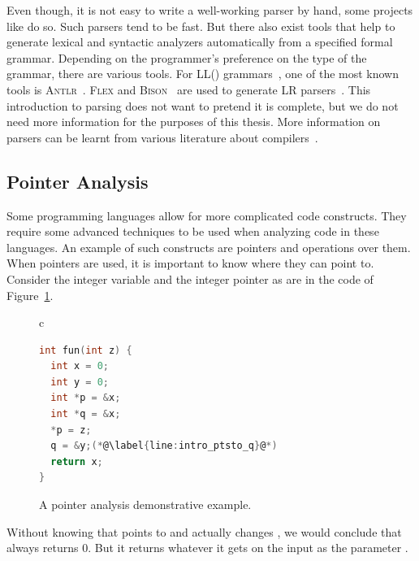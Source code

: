 Even though, it is not easy to write a well-working parser by hand, some
projects like \gcc do so. Such parsers tend to be fast. But there also
exist tools that help to generate lexical and syntactic analyzers
automatically from a specified formal grammar.  Depending on the programmer's
preference on the type of the grammar, there are various tools. For
LL(\textasteriskcentered) grammars~\cite[Chapter 4.4]{dragon}, one of the most
known tools is \textsc{Antlr}~\cite{antlr4}.  \textsc{Flex} and
\textsc{Bison}~\cite{flex_bison} are used to generate LR parsers~\cite[Chapter
4.5]{dragon}. This introduction to parsing does not want to pretend it is
complete, but we do not need more information for the purposes of this thesis.
More information on parsers can be learnt from various literature about
compilers~\cite{dragon, muchnick}.

\subsection{Pointer Analysis}\label{sec:pointer_analysis}
Some programming languages allow for more complicated code constructs. They
require some advanced techniques to be used when analyzing code in these
languages. An example of such constructs are pointers and operations over
them. When pointers are used, it is important to know where they can point to.
Consider the integer variable  and the integer pointer  as are
in the code of Figure~\ref{fig:lst_ptsto}.
\begin{figure}[htb]
  \begin{center}
  \begin{tabular}{c}
  \begin{lstlisting}[language=C]
int fun(int z) {
  int x = 0;
  int y = 0;
  int *p = &x;
  int *q = &x;
  *p = z;
  q = &y;(*@\label{line:intro_ptsto_q}@*)
  return x;
}
  \end{lstlisting}
  \end{tabular}
  \end{center}
  \caption{A pointer analysis demonstrative example.}
  \label{fig:lst_ptsto}
\end{figure}
Without knowing that  points to and actually changes , we
would conclude that  always returns 0. But it returns whatever it
gets on the input as the parameter .

